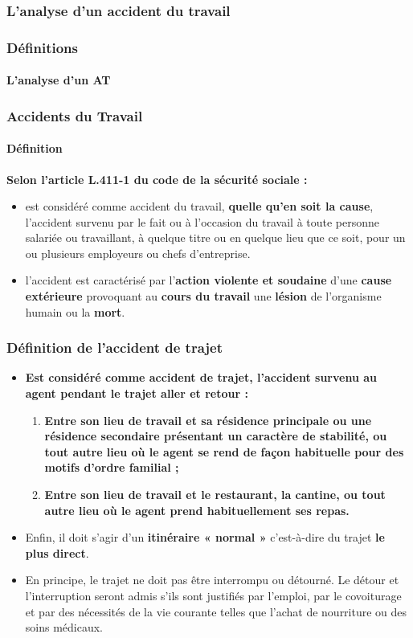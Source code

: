 \documentclass{beamer}
\begin{document}
\begin{frame}
\frametitle{L’analyse d’un accident du travail}

\end{frame}


\begin{frame}
\frametitle{Définitions}
\framesubtitle{L’analyse d'un AT}


\end{frame}

\begin{frame}
\frametitle{Accidents du Travail}
\framesubtitle{Définition}

\textbf{Selon l’article L.411-1 du code de la sécurité sociale : }
\begin{itemize}
\item est considéré comme accident du travail, \textbf{quelle qu'en soit la cause}, l'accident survenu par le fait ou à l'occasion du travail à toute personne salariée ou travaillant, à quelque titre ou en quelque lieu que ce soit, pour un ou plusieurs employeurs ou chefs d'entreprise.

\item l’accident est caractérisé par l’\textbf{action violente et soudaine} d’une \textbf{cause extérieure} provoquant au \textbf{cours du travail} une \textbf{lésion} de l’organisme humain ou la \textbf{mort}.
\end{itemize}
\end{frame}

\begin{frame}
\frametitle{Définition de l'accident de trajet}

\begin{itemize}
    \item \textbf{Est considéré comme accident de trajet, l’accident survenu au agent pendant le trajet aller et retour :}
\begin{enumerate}
\item \textbf{Entre son lieu de travail et sa résidence principale ou une résidence secondaire présentant un caractère de stabilité, ou tout autre lieu où le agent se rend de façon habituelle pour des motifs d’ordre familial ;}
\item \textbf{Entre son lieu de travail et le restaurant, la cantine, ou tout autre lieu où le agent prend habituellement ses repas.}
\end{enumerate}
\item Enfin, il doit s’agir d’un \textbf{itinéraire « normal »} c’est-à-dire du trajet \textbf{le plus direct}. 
\item En principe, le trajet ne doit pas être interrompu ou détourné. Le détour et l'interruption seront admis s'ils sont justifiés par l'emploi, par le covoiturage et par des nécessités de la vie courante telles que l'achat de nourriture ou des soins médicaux.
\end{itemize}
\end{frame}
\end{document}
